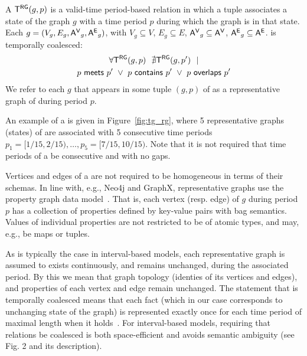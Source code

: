 \begin{definition}[TGraph]
A \tg $\mathsf{T^{RG}}(g, p)$ is a valid-time period-based relation in which a
tuple associates a state of the graph $g$ with a time period $p$
during which the graph is in that state.
%
Each $g = (V_g, E_g, \mathsf{A^{V}}_g, \mathsf{A^{E}}_g)$, with $V_g \subseteq V$, $E_g
\subseteq E$, $\mathsf{A^{V}}_g \subseteq \mathsf{A^{V}}$, $\mathsf{A^{E}}_g \subseteq \mathsf{A^{E}}$.
%
\tgg is temporally coalesced:
\begin{multline}
\forall \mathsf{T^{RG}}(g,p)~~\nexists \mathsf{T^{RG}}(g,p')~~| \\
        p~\mathsf{meets}~p'~\lor~p~\mathsf{contains}~p'~\lor~p~\mathsf{overlaps}~p'
\end{multline}
We refer to each $g$ that appears in some tuple $(g,p)$ of \tgg as a
representative graph of \tgg during period $p$.
\label{def:tg_abstract}
\end{definition}

An example of a \tg is given in Figure~\ref{fig:tg_rg}, where 5
representative graphs (states) of  are associated with 5
consecutive time periods $p_1=[1/15, 2/15), \ldots, p_5=[7/15, 10/15)$.
    Note that it is not required that time periods of a \tg be
    consecutive and with no gaps.

    Vertices and edges of a \tg are not required to be homogeneous in
    terms of their schemas.  In line with, e.g., Neo4j and GraphX,
    representative graphs use the property graph data
    model~\cite{GraphDB}.  That is, each vertex (resp. edge) of $g$
    during period $p$ has a collection of properties defined by
    key-value pairs with bag semantics.  Values of individual
    properties are not restricted to be of atomic types, and may,
    e.g., be maps or tuples.


As is typically the case in interval-based models, each representative
graph is assumed to exists continuously, and remains unchanged, during
the associated period.  By this we mean that graph topology (identies
of its vertices and edges), and properties of each vertex and edge
remain unchanged.
%
The statement that \tgg is temporally coalesced means that each fact
(which in our case corresponds to unchanging state of the graph) is
represented exactly once for each time period of maximal length when
it holds~\cite{DBLP:conf/vldb/BohlenSS96}.  For interval-based models,
requiring that relations be coalesced is both space-efficient and
avoids semantic ambiguity (see~\cite{DBLP:reference/db/JensenS09k}
Fig. 2 and its description).

